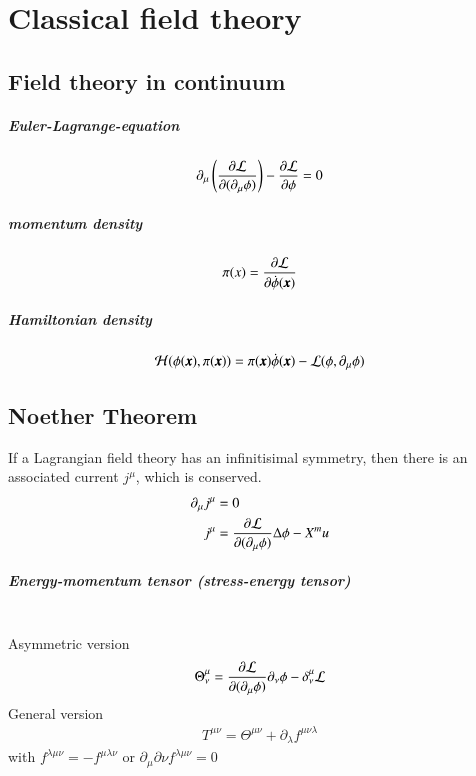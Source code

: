 \chapter{Classical field theory}
\setcounter{chapter}{1}
\section{Field theory in continuum}
\paragraph{Euler-Lagrange-equation}
\begin{align}
	\partial_\mu \left( \frac{\partial \mathcal{L}}{\partial(\partial_\mu \phi)} \right) - \frac{\partial \mathcal{L}}{\partial \phi} = 0
\end{align}
\paragraph{momentum density}
\begin{align}
	\pi(x) = \frac{\partial \mathcal{L}}{\partial \dot{\phi}(\pmb{x})}
\end{align}
\paragraph{Hamiltonian density}
\begin{align}
	\mathcal{H}(\phi(\pmb{x}),\pi(\pmb{x})) = \pi(\pmb{x}) \dot{\phi}(\pmb{x}) - \mathcal{L}(\phi,\partial_\mu \phi)
\end{align}
\section{Noether Theorem}
If a Lagrangian field theory has an infinitisimal symmetry, then there is an associated current $j^\mu$, which is conserved.
\begin{align}
	\partial_\mu j^\mu &= 0 \\
	j^\mu &= \frac{\partial \mathcal{L}}{\partial (\partial_\mu \phi)} \Delta \phi - X^mu
\end{align}
\paragraph{Energy-momentum tensor (stress-energy tensor)} \hspace{0pt}\\
Asymmetric version
\begin{align}
	\Theta^\mu_\nu = \frac{\partial \mathcal{L}}{\partial(\partial_\mu \phi)} \partial_\nu \phi - \delta^\mu_\nu \mathcal{L}
\end{align}
General version
\begin{align}
	T^{\mu\nu} = \Theta^{\mu\nu} + \partial_\lambda f^{\mu\nu\lambda}
\end{align}
with $f^{\lambda\mu\nu}=-f^{\mu\lambda\nu}$ or $\partial_\mu \partial\nu f^{\lambda\mu\nu}=0$

